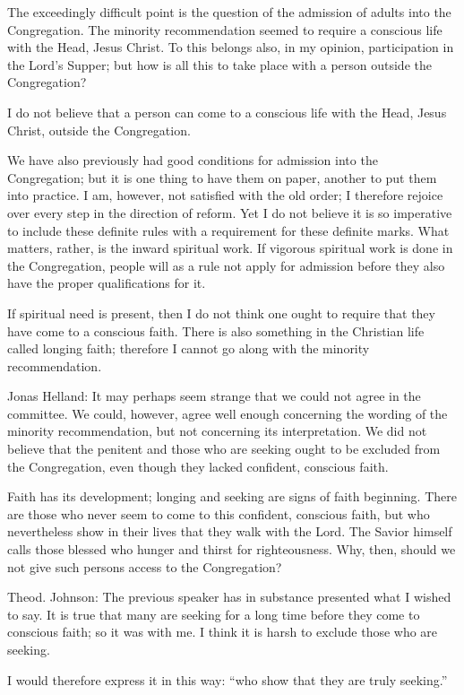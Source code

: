 The exceedingly difficult point is the question of the admission of adults into the Congregation. The minority recommendation seemed to require a conscious life with the Head, Jesus Christ. To this belongs also, in my opinion, participation in the Lord’s Supper; but how is all this to take place with a person outside the Congregation?

I do not believe that a person can come to a conscious life with the Head, Jesus Christ, outside the Congregation.

We have also previously had good conditions for admission into the Congregation; but it is one thing to have them on paper, another to put them into practice. I am, however, not satisfied with the old order; I therefore rejoice over every step in the direction of reform. Yet I do not believe it is so imperative to include these definite rules with a requirement for these definite marks. What matters, rather, is the inward spiritual work. If vigorous spiritual work is done in the Congregation, people will as a rule not apply for admission before they also have the proper qualifications for it.

If spiritual need is present, then I do not think one ought to require that they have come to a conscious faith. There is also something in the Christian life called longing faith; therefore I cannot go along with the minority recommendation.

Jonas Helland: It may perhaps seem strange that we could not agree in the committee. We could, however, agree well enough concerning the wording of the minority recommendation, but not concerning its interpretation. We did not believe that the penitent and those who are seeking ought to be excluded from the Congregation, even though they lacked confident, conscious faith.

Faith has its development; longing and seeking are signs of faith beginning. There are those who never seem to come to this confident, conscious faith, but who nevertheless show in their lives that they walk with the Lord. The Savior himself calls those blessed who hunger and thirst for righteousness. Why, then, should we not give such persons access to the Congregation?

Theod. Johnson: The previous speaker has in substance presented what I wished to say. It is true that many are seeking for a long time before they come to conscious faith; so it was with me. I think it is harsh to exclude those who are seeking.

I would therefore express it in this way: “who show that they are truly seeking.”


